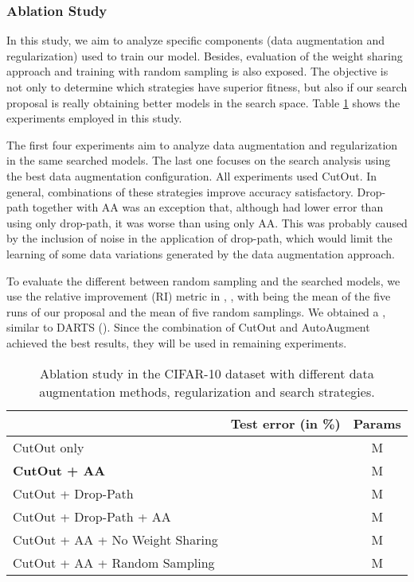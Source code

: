 \documentclass[conference]{IEEEtran}
\begin{document}
	\subsubsection{Ablation Study}
	
	In this study, we aim to analyze specific components (data augmentation and regularization) used to train our model. 
	Besides, evaluation of the weight sharing approach and training with random sampling is also exposed. 
	The objective is not only to determine which strategies have superior fitness, but also if our search proposal is really obtaining better models in the search space.
	Table \ref{tab:ablation} shows the experiments employed in this study.
	
	The first four experiments aim to analyze data augmentation and regularization in the same searched models. 
	The last one focuses on the search analysis using the best data augmentation configuration. 
	All experiments used CutOut.
	In general, combinations of these strategies improve accuracy satisfactory.
	Drop-path together with AA was an exception that, although had lower error than using only drop-path, it was worse than using only AA.
	This was probably caused by the inclusion of noise in the application of drop-path, which would limit the learning of some data variations generated by the data augmentation approach.
	
	To evaluate the different between random sampling and the searched models, we use the relative improvement (RI) metric in \cite{Yang2020NAS}, , with  being the mean of the five runs of our proposal and  the mean of five random samplings.
	We obtained a , similar to DARTS (). 
	Since the combination of CutOut and AutoAugment  achieved the best results, they will be used in remaining experiments.
	
	\begin{table}[htb]
		\centering
		\caption{Ablation study in the CIFAR-10 dataset with different data augmentation methods, regularization and search strategies. }
		\label{tab:ablation}
		\begin{tabular}{@{}lcc@{}}
			\toprule
			& \textbf{Test error (in \%)} & \textbf{Params}  \\ \midrule
			CutOut only                     &                & M \\
			\textbf{CutOut + AA}             &                & M \\
			CutOut + Drop-Path               &                & M \\
			CutOut + Drop-Path + AA          &                & M \\ \midrule
			CutOut + AA + No Weight Sharing &                & M \\
			CutOut + AA + Random Sampling   &                & M \\ \bottomrule
		\end{tabular}
	\end{table}
	
\end{document}
